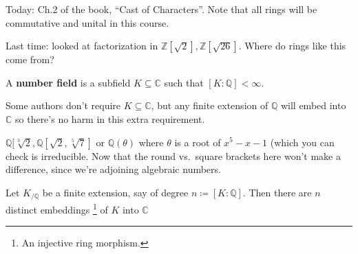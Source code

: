 Today: Ch.2 of the book, ``Cast of Characters''. Note that all rings
will be commutative and unital in this course.

Last time: looked at factorization in
\({\mathbb{Z}}[\sqrt 2], {\mathbb{Z}}[\sqrt{26}]\). Where do rings like
this come from?

\begin{definition}

A \textbf{number field} is a subfield \(K \subseteq {\mathbb{C}}\) such
that \([K: {\mathbb{Q}}] < \infty\).

\end{definition}

\begin{remark}

Some authors don't require \(K \subseteq {\mathbb{C}}\), but any finite
extension of \({\mathbb{Q}}\) will embed into \({\mathbb{C}}\) so
there's no harm in this extra requirement.

\end{remark}

\begin{example}[?]

\({\mathbb{Q}}[\sqrt[3]{2}, {\mathbb{Q}}[\sqrt 2, \sqrt[5]{7}]\) or
\({\mathbb{Q}}(\theta)\) where \(\theta\) is a root of \(x^5 - x - 1\)
(which you can check is irreducible. Now that the round vs.~square
brackets here won't make a difference, since we're adjoining algebraic
numbers.

\end{example}

\begin{proposition}[?]

Let \(K_{/{\mathbb{Q}}}\) be a finite extension, say of degree
\(n\coloneqq[K: {\mathbb{Q}}]\). Then there are \(n\) distinct
embeddings \footnote{An injective ring morphism.} of \(K\) into
\({\mathbb{C}}\)

\end{proposition}

